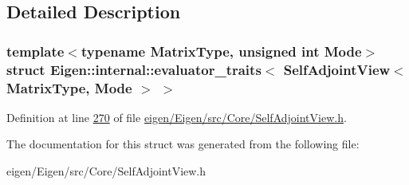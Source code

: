 \subsection{Detailed Description}
\subsubsection*{template$<$typename Matrix\+Type, unsigned int Mode$>$\newline
struct Eigen\+::internal\+::evaluator\+\_\+traits$<$ Self\+Adjoint\+View$<$ Matrix\+Type, Mode $>$ $>$}



Definition at line \hyperlink{eigen_2_eigen_2src_2_core_2_self_adjoint_view_8h_source_l00270}{270} of file \hyperlink{eigen_2_eigen_2src_2_core_2_self_adjoint_view_8h_source}{eigen/\+Eigen/src/\+Core/\+Self\+Adjoint\+View.\+h}.



The documentation for this struct was generated from the following file\+:\begin{DoxyCompactItemize}
\item 
eigen/\+Eigen/src/\+Core/\+Self\+Adjoint\+View.\+h\end{DoxyCompactItemize}
